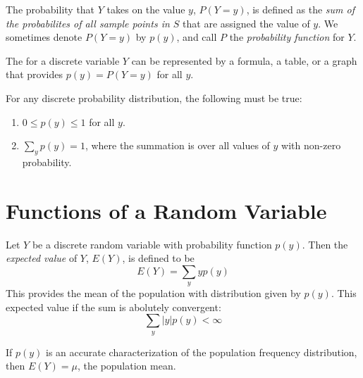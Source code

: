 \documentclass[12pt, a4paper, twoside, openright, titlepage]{book}
\begin{document}
\begin{defn}{}{}
    The probability that $Y$ takes on the value $y$, $P(Y=y)$, is defined as the \emph{sum of the probabilites of all sample points in $S$} that are assigned the value of $y$. We sometimes denote $P(Y=y)$ by $p(y)$, and call $P$ the \emph{probability function} for $Y$.
\end{defn}


\begin{defn}{}{}
    The  for a discrete variable $Y$ can be represented by a formula, a table, or a graph that provides $p(y) = P(Y=y)$ for all $y$.
\end{defn}


\begin{thm}{}{}
    For any discrete probability distribution, the following must be true: \begin{enumerate}
        \item $0 \leq p(y) \leq 1$ for all $y$.
        \item $\sum_yp(y) = 1$, where the summation is over all values of $y$ with non-zero probability.
    \end{enumerate}
\end{thm}


\section{\textsection Functions of a Random Variable}

\begin{defn}{}{}
    Let $Y$ be a discrete random variable with probability function $p(y)$. Then the \emph{expected value} of $Y$, $E(Y)$, is defined to be \begin{equation*}
        E(Y) = \sum_yyp(y)
    \end{equation*}
    This provides the mean of the population with distribution given by $p(y)$. This expected value if the sum is abolutely convergent: \begin{equation*}
        \sum_y|y|p(y) < \infty
    \end{equation*}
\end{defn}

\begin{rmk}{}{}
    If $p(y)$ is an accurate characterization of the population frequency distribution, then $E(Y) = \mu$, the population mean.
\end{rmk}
\end{document}
